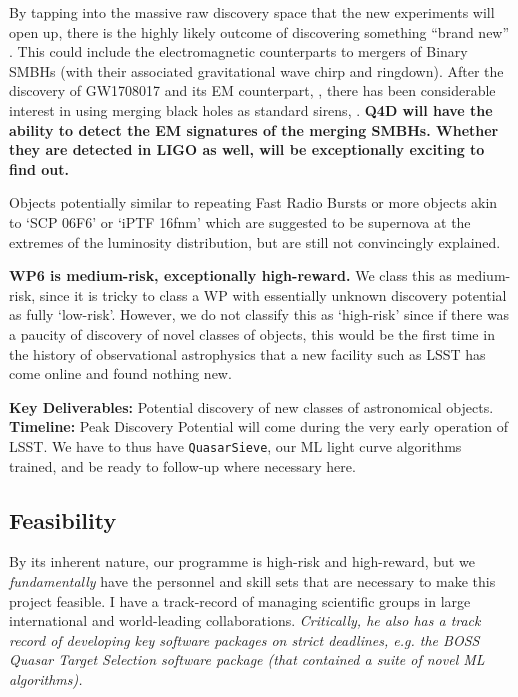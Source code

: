 \smallskip
\smallskip
\noindent
By tapping into the massive raw discovery space that the new
experiments will open up, there is the highly likely outcome of
discovering something ``brand new'' \citep{Ivezic2008_LSST, 
LSST}. 
This could include the electromagnetic counterparts to 
mergers of Binary SMBHs (with their associated gravitational wave
chirp and ringdown). After the discovery of GW1708017 \citep{GW170817} 
and its EM counterpart, \citep{GW170817_multi}, there has been 
considerable interest in using merging black holes as standard 
sirens, \citep[][]{GW170817_H0}. 
{\bf Q4D will have the ability to detect the EM signatures of 
the merging SMBHs. Whether they are detected in LIGO as well, 
will be exceptionally exciting to find out.}

\smallskip
\smallskip
\noindent
Objects potentially similar to repeating Fast Radio Bursts 
\citep{Spitler2016} or more objects akin to 
`SCP 06F6' \citep{Barbary2009} or 
`iPTF 16fnm' \citep{Miller2017} 
which are suggested to be supernova at the extremes of the
luminosity distribution, but are still not convincingly explained.


\smallskip
\smallskip
\noindent
{\bf WP6 is medium-risk, exceptionally high-reward.}  We class this as
medium-risk, since it is tricky to class a WP with essentially unknown
discovery potential as fully `low-risk'. However, we do not classify
this as `high-risk' since if there was a paucity of discovery of novel
classes of objects, this would be the first time in the history of
observational astrophysics that a new facility such as LSST has come
online and found nothing new.  

\smallskip
\smallskip
\noindent
{\bf Key Deliverables:} Potential
discovery of new classes of astronomical objects.
{\bf Timeline:} Peak Discovery Potential will come during the 
very early operation of LSST. We have to thus have {\tt QuasarSieve}, 
our ML light curve algorithms trained, and be ready 
to follow-up where necessary here. 


\medskip  \medskip \smallskip \smallskip \noindent
\subsection{Feasibility}

\smallskip
\smallskip
\noindent
By its inherent nature, our programme is high-risk and high-reward, but
we {\it fundamentally} have the personnel and skill sets that are 
necessary to make this project feasible. 
I have a track-record of managing scientific groups in 
large international and world-leading collaborations. {\it Critically, 
he also has a track record of developing key software packages 
on strict deadlines, e.g. the BOSS Quasar Target Selection software 
package (that contained a suite of novel ML algorithms).}
%
%

